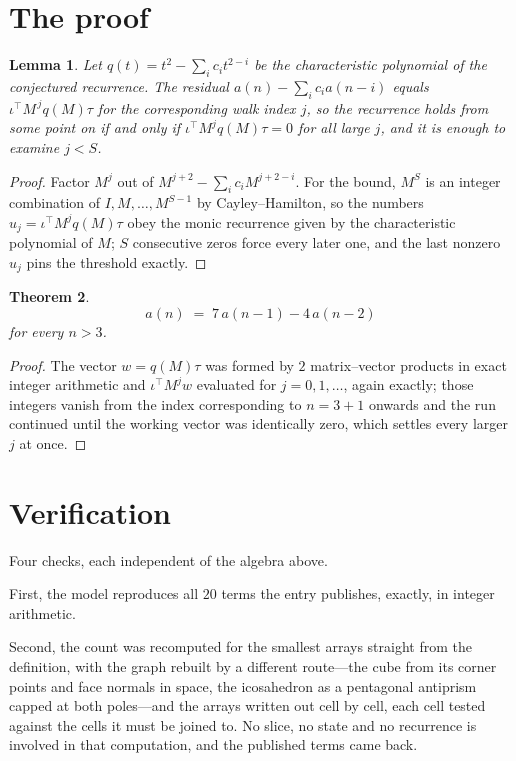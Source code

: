 \documentclass[11pt,a4paper]{article}
\theoremstyle{plain}
\newtheorem{theorem}{Theorem}
\newtheorem{lemma}[theorem]{Lemma}
\theoremstyle{definition}
\begin{document}
\section{The proof}

\begin{lemma}\label{lem:crit}
Let $q(t)=t^{2}-\sum_i c_it^{2-i}$ be the characteristic polynomial of the
conjectured recurrence. The residual $a(n)-\sum_ic_ia(n-i)$ equals
$\iota^{\!\top}M^{\,j}q(M)\tau$ for the corresponding walk index $j$, so the recurrence
holds from some point on if and only if $\iota^{\!\top}M^{j}q(M)\tau=0$ for all large $j$,
and it is enough to examine $j<S$.
\end{lemma}

\begin{proof}
Factor $M^{j}$ out of $M^{j+2}-\sum_ic_iM^{j+2-i}$. For the bound, $M^{S}$
is an integer combination of $I,M,\dots,M^{S-1}$ by Cayley--Hamilton, so the numbers
$u_j=\iota^{\!\top}M^{j}q(M)\tau$ obey the monic recurrence given by the characteristic
polynomial of $M$; $S$ consecutive zeros force every later one, and the last nonzero $u_j$
pins the threshold exactly.
\end{proof}

\begin{theorem}
\[
a(n)\;=\;7\,a(n-1) - 4\,a(n-2)
\]
for every $n>3$.
\end{theorem}

\begin{proof}
The vector $w=q(M)\tau$ was formed by $2$ matrix--vector products in exact integer
arithmetic and $\iota^{\!\top}M^{j}w$ evaluated for $j=0,1,\dots$, again exactly; those
integers vanish from the index corresponding to $n=3+1$ onwards and the run continued
until the working vector was identically zero, which settles every larger $j$ at once.
\end{proof}

\section{Verification}

Four checks, each independent of the algebra above.

First, the model reproduces all $20$ terms the entry publishes, exactly, in integer
arithmetic.

Second, the count was recomputed for the smallest arrays straight from the definition, with the
graph rebuilt by a different route---the cube from its corner points and face normals in space,
the icosahedron as a pentagonal antiprism capped at both poles---and the arrays written out cell
by cell, each cell tested against the cells it must be joined to. No slice, no state and no
recurrence is involved in that computation, and the published terms came back.
\end{document}
